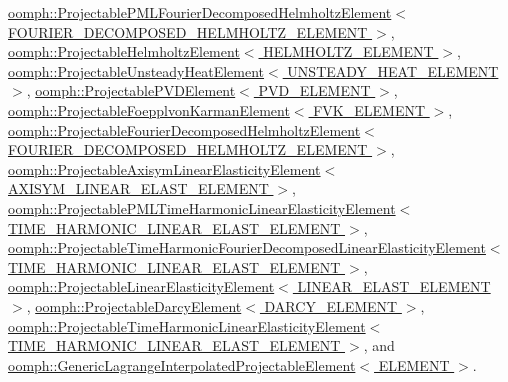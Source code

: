 \hyperlink{classoomph_1_1ProjectablePMLFourierDecomposedHelmholtzElement_a58a9c476841f68800763a24421717f63}{oomph\+::\+Projectable\+P\+M\+L\+Fourier\+Decomposed\+Helmholtz\+Element$<$ F\+O\+U\+R\+I\+E\+R\+\_\+\+D\+E\+C\+O\+M\+P\+O\+S\+E\+D\+\_\+\+H\+E\+L\+M\+H\+O\+L\+T\+Z\+\_\+\+E\+L\+E\+M\+E\+N\+T $>$}, \hyperlink{classoomph_1_1ProjectableHelmholtzElement_a8a516cbf286391aa6e3c0651db47de6f}{oomph\+::\+Projectable\+Helmholtz\+Element$<$ H\+E\+L\+M\+H\+O\+L\+T\+Z\+\_\+\+E\+L\+E\+M\+E\+N\+T $>$}, \hyperlink{classoomph_1_1ProjectableUnsteadyHeatElement_a8966da6a379eb20fcf86efe03c681a86}{oomph\+::\+Projectable\+Unsteady\+Heat\+Element$<$ U\+N\+S\+T\+E\+A\+D\+Y\+\_\+\+H\+E\+A\+T\+\_\+\+E\+L\+E\+M\+E\+N\+T $>$}, \hyperlink{classoomph_1_1ProjectablePVDElement_a3ef16d41268f4cdb67718a5c2fca3cab}{oomph\+::\+Projectable\+P\+V\+D\+Element$<$ P\+V\+D\+\_\+\+E\+L\+E\+M\+E\+N\+T $>$}, \hyperlink{classoomph_1_1ProjectableFoepplvonKarmanElement_aaa74e7c246f86929e7ceeeced8819d6c}{oomph\+::\+Projectable\+Foepplvon\+Karman\+Element$<$ F\+V\+K\+\_\+\+E\+L\+E\+M\+E\+N\+T $>$}, \hyperlink{classoomph_1_1ProjectableFourierDecomposedHelmholtzElement_a222ce07a334691bbff3f3ec7c8049ada}{oomph\+::\+Projectable\+Fourier\+Decomposed\+Helmholtz\+Element$<$ F\+O\+U\+R\+I\+E\+R\+\_\+\+D\+E\+C\+O\+M\+P\+O\+S\+E\+D\+\_\+\+H\+E\+L\+M\+H\+O\+L\+T\+Z\+\_\+\+E\+L\+E\+M\+E\+N\+T $>$}, \hyperlink{classoomph_1_1ProjectableAxisymLinearElasticityElement_ae470acc9389f7737d54f27751593429e}{oomph\+::\+Projectable\+Axisym\+Linear\+Elasticity\+Element$<$ A\+X\+I\+S\+Y\+M\+\_\+\+L\+I\+N\+E\+A\+R\+\_\+\+E\+L\+A\+S\+T\+\_\+\+E\+L\+E\+M\+E\+N\+T $>$}, \hyperlink{classoomph_1_1ProjectablePMLTimeHarmonicLinearElasticityElement_a4f47d55d9864a060d434bdf1fcf0ebe1}{oomph\+::\+Projectable\+P\+M\+L\+Time\+Harmonic\+Linear\+Elasticity\+Element$<$ T\+I\+M\+E\+\_\+\+H\+A\+R\+M\+O\+N\+I\+C\+\_\+\+L\+I\+N\+E\+A\+R\+\_\+\+E\+L\+A\+S\+T\+\_\+\+E\+L\+E\+M\+E\+N\+T $>$}, \hyperlink{classoomph_1_1ProjectableTimeHarmonicFourierDecomposedLinearElasticityElement_aee73e1027994f0c4908d048a930c3992}{oomph\+::\+Projectable\+Time\+Harmonic\+Fourier\+Decomposed\+Linear\+Elasticity\+Element$<$ T\+I\+M\+E\+\_\+\+H\+A\+R\+M\+O\+N\+I\+C\+\_\+\+L\+I\+N\+E\+A\+R\+\_\+\+E\+L\+A\+S\+T\+\_\+\+E\+L\+E\+M\+E\+N\+T $>$}, \hyperlink{classoomph_1_1ProjectableLinearElasticityElement_aefdb5cd9080bec31457d79ce3a888625}{oomph\+::\+Projectable\+Linear\+Elasticity\+Element$<$ L\+I\+N\+E\+A\+R\+\_\+\+E\+L\+A\+S\+T\+\_\+\+E\+L\+E\+M\+E\+N\+T $>$}, \hyperlink{classoomph_1_1ProjectableDarcyElement_ae6daf28fea08e70d77bcdcb5426b0fb9}{oomph\+::\+Projectable\+Darcy\+Element$<$ D\+A\+R\+C\+Y\+\_\+\+E\+L\+E\+M\+E\+N\+T $>$}, \hyperlink{classoomph_1_1ProjectableTimeHarmonicLinearElasticityElement_a2c8f219649069bad135a0a1ca7bcd907}{oomph\+::\+Projectable\+Time\+Harmonic\+Linear\+Elasticity\+Element$<$ T\+I\+M\+E\+\_\+\+H\+A\+R\+M\+O\+N\+I\+C\+\_\+\+L\+I\+N\+E\+A\+R\+\_\+\+E\+L\+A\+S\+T\+\_\+\+E\+L\+E\+M\+E\+N\+T $>$}, and \hyperlink{classoomph_1_1GenericLagrangeInterpolatedProjectableElement_abc3c4f65ddb05984629ad9e35daa209a}{oomph\+::\+Generic\+Lagrange\+Interpolated\+Projectable\+Element$<$ E\+L\+E\+M\+E\+N\+T $>$}.



